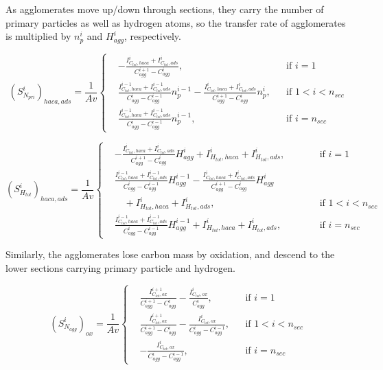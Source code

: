 As agglomerates move up/down through sections, they carry the number of primary particles as well as hydrogen atoms, so the transfer rate of agglomerates is multiplied by ${n^i_p}$ and ${H^i_{agg}}$, respectively. 

\begin{equation}
	\left(S^i_{N_{pri}}\right)_{haca, ads}=
	\frac{1}{Av}
	\left\{
	\begin{aligned}
		&-\frac{I^i_{C_{tot},haca}+I^i_{C_{tot},ads}}{C^{i+1}_{agg}-C^{i}_{agg}},
		&&
		\text{if } i = 1
		\\
		&\frac{I^{i-1}_{C_{tot},haca}+I^{i-1}_{C_{tot},ads}}{C^{i}_{agg}-C^{i-1}_{agg}}n^{i-1}_p
		-\frac{I^{i}_{C_{tot},haca}+I^{i}_{C_{tot},ads}}{C^{i+1}_{agg}-C^{i}_{agg}}n^{i}_p,
		&&
		\text{if } 1 < i < n_{sec}
		\\
		&\frac{I^{i-1}_{C_{tot},haca}+I^{i-1}_{C_{tot},ads}}{C^{i}_{agg}-C^{i-1}_{agg}}n^{i-1}_p,
		&&\text{if } i=n_{sec}
	\end{aligned}
	\right.
	\label{eqn:S_Npri_gradssect}
\end{equation}


\begin{equation}
	\left(S^i_{H_{tot}}\right)_{haca, ads}=
	\frac{1}{Av}
	\left\{
	\begin{alignedat}{2}
		&-\frac{I^i_{C_{tot},haca}+I^i_{C_{tot},ads}}{C^{i+1}_{agg}-C^{i}_{agg}}H^{i}_{agg}
		+ I^{i}_{H_{tot},haca} + I^{i}_{H_{tot},ads},
		&\qquad& \text{if } i = 1
		\\
		&\frac{I^{i-1}_{C_{tot},haca}+I^{i-1}_{C_{tot},ads}}{C^{i}_{agg}-C^{i-1}_{agg}}H^{i-1}_{agg}
		-\frac{I^{i}_{C_{tot},haca}+I^{i}_{C_{tot},ads}}{C^{i+1}_{agg}-C^{i}_{agg}}H^{i}_{agg}
		\\
		&\quad 
		+ I^{i}_{H_{tot},haca} + I^{i}_{H_{tot},ads},
		&\qquad& \text{if } 1 < i < n_{sec}
		\\
		&\frac{I^{i-1}_{C_{tot},haca}+I^{i-1}_{C_{tot},ads}}{C^{i}_{agg}-C^{i-1}_{agg}}H^{i-1}_{agg}
		+ I^{i}_{H_{tot},haca} + I^{i}_{H_{tot},ads},
		&\qquad& \text{if } i=n_{sec}
	\end{alignedat}
	\right.
	\label{eqn:S_Htot_gradssect}
\end{equation}


Similarly, the agglomerates lose carbon mass by oxidation, and descend to the lower sections carrying primary particle and hydrogen.

\begin{equation}
	\left(S^i_{N_{agg}}\right)_{ox}=
	\frac{1}{Av}
	\left\{
	\begin{aligned}
		&\frac{I^{i+1}_{C_{tot},ox}}{C^{i+1}_{agg}-C^{i}_{agg}}
		-
		\frac{I^{i}_{C_{tot},ox}}{C^{i}_{agg}},
		&&
		\text{if } i = 1
		\\
		&\frac{I^{i+1}_{C_{tot},ox}}{C^{i+1}_{agg}-C^{i}_{agg}}
		-
		\frac{I^{i}_{C_{tot},ox}}{C^{i}_{agg}-C^{i-1}_{agg}},
		&&
		\text{if } 1 < i < n_{sec}
		\\
		&
		-
		\frac{I^{i}_{C_{tot},ox}}{C^{i}_{agg}-C^{i-1}_{agg}},
		&&\text{if } i=n_{sec}
	\end{aligned}
	\right.
	\label{eqn:S_Nagg_oxsect}
\end{equation}

